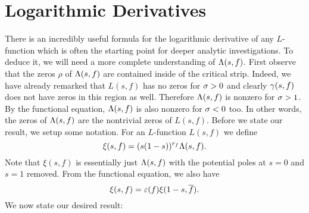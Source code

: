   \section{Logarithmic Derivatives}
    There is an incredibly useful formula for the logarithmic derivative of any $L$-function which is often the starting point for deeper analytic investigations. To deduce it, we will need a more complete understanding of $\Lambda(s,f)$. First observe that the zeros $\rho$ of $\Lambda(s,f)$ are contained inside of the critical strip. Indeed, we have already remarked that $L(s,f)$ has no zeros for $\sigma > 0$ and clearly $\gamma(s,f)$ does not have zeros in this region as well. Therefore $\Lambda(s,f)$ is nonzero for $\sigma > 1$. By the functional equation, $\Lambda(s,f)$ is also nonzero for $\sigma < 0$ too. In other words, the zeros of $\Lambda(s,f)$ are the nontrivial zeros of $L(s,f)$. Before we state our result, we setup some notation. For an $L$-function $L(s,f)$ we define
    \[
      \xi(s,f) = (s(1-s))^{r_{f}}\Lambda(s,f).
    \]
    Note that $\xi(s,f)$ is essentially just $\Lambda(s,f)$ with the potential poles at $s = 0$ and $s = 1$ removed. From the functional equation, we also have
    \[
      \xi(s,f) = \varepsilon(f)\xi(1-s,\overline{f}).
    \]
    We now state our desired result:

